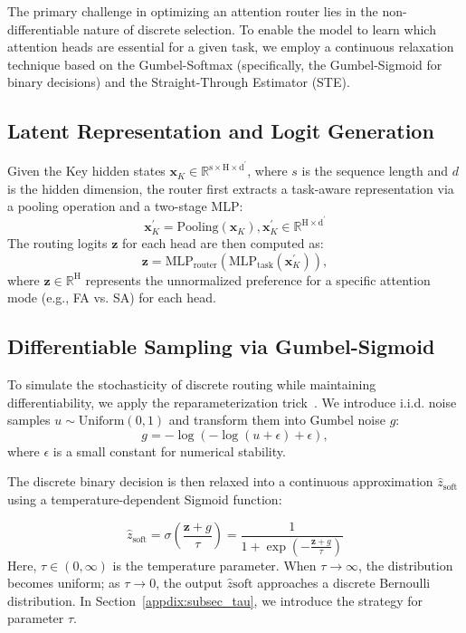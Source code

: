 The primary challenge in optimizing an attention router lies in the non-differentiable nature of discrete selection. 
To enable the model to learn which attention heads are essential for a given task, we employ a continuous relaxation technique based on the Gumbel-Softmax (specifically, the Gumbel-Sigmoid for binary decisions) and the Straight-Through Estimator (STE).\subsection{Latent Representation and Logit Generation}Given the Key hidden states $\boldsymbol{x}_K \in \mathbb{R}^{\mathrm{s \times H \times d^{\prime}}}$, where $s$ is the sequence length and $d$ is the hidden dimension, the router first extracts a task-aware representation via a pooling operation and a two-stage MLP:
\begin{equation}
\boldsymbol{x}_K^{\prime} = \text{Pooling}(\boldsymbol{x}_K), \boldsymbol{x}_K^{\prime} \in \mathbb{R}^{\mathrm{H \times d^{\prime}}}
\end{equation}
The routing logits $\mathbf{z}$ for each head are then computed as:
\begin{equation}
\mathbf{z} = \text{MLP}_{\text{router}}(\text{MLP}_{\text{task}}(\boldsymbol{x}_K^{\prime})),
\end{equation}
where $\mathbf{z} \in \mathbb{R}^\mathrm{H}$ represents the unnormalized preference for a specific attention mode (e.g., FA vs. SA) for each head.

\subsection{Differentiable Sampling via Gumbel-Sigmoid}To simulate the stochasticity of discrete routing while maintaining differentiability, we apply the reparameterization trick~\citep{bhaskar2025cache}. 
We introduce i.i.d. noise samples $u \sim \text{Uniform}(0, 1)$ and transform them into Gumbel noise $g$:
\begin{equation}
g = -\log(-\log(u + \epsilon) + \epsilon),
\end{equation}
where $\epsilon$ is a small constant for numerical stability. 

The discrete binary decision is then relaxed into a continuous approximation $\hat{z}_{\text{soft}}$ using a temperature-dependent Sigmoid function:

\begin{equation}
\hat{z}_{\text{soft}} = \sigma \left( \frac{\mathbf{z} + g}{\tau} \right) = \frac{1}{1 + \exp\left( -\frac{\mathbf{z} + g}{\tau} \right)}
\end{equation}
Here, $\tau \in (0, \infty)$ is the temperature parameter. When $\tau \to \infty$, the distribution becomes uniform; as $\tau \to 0$, the output $\hat{z}{\text{soft}}$ approaches a discrete Bernoulli distribution. 
In Section~\ref{appdix:subsec_tau}, we introduce the strategy for parameter $\tau$.


